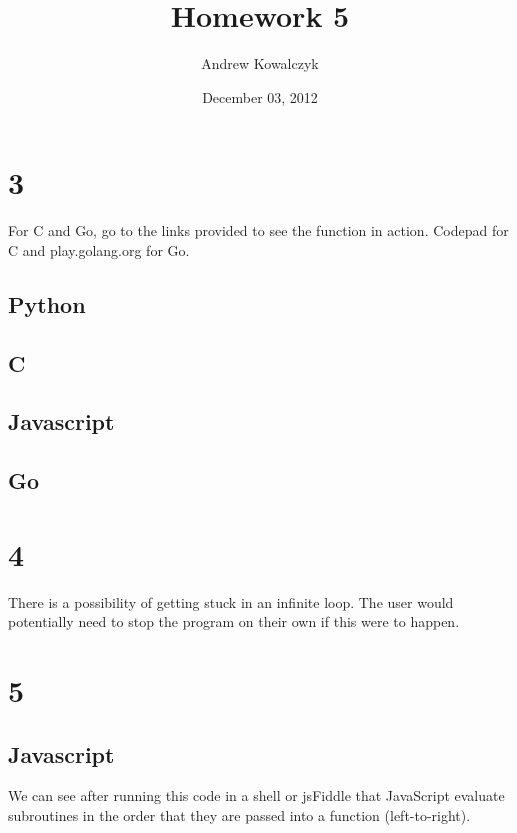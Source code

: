 \documentclass[11pt, oneside]{article}
\title{Homework 5}
\author{Andrew Kowalczyk}
\date{December 03, 2012}							%
\begin{document}
\maketitle

\section*{3}

For C and Go, go to the links provided to see the function in action. Codepad for C and play.golang.org for Go.

\subsection*{Python}


\subsection*{C}


\subsection*{Javascript}


\subsection*{Go}


\section*{4}
There is a possibility of getting stuck in an infinite loop. The user would potentially need to stop the program on their own if this were to happen.

\section*{5}
\subsection*{Javascript}


We can see after running this code in a shell or jsFiddle that JavaScript evaluate subroutines in the order that they are passed into a function (left-to-right).
\end{document}
